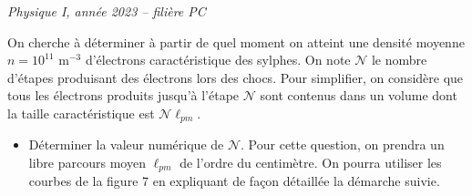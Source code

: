 \textit{Physique I, année 2023 -- filière PC}

On cherche à déterminer à partir de quel moment on atteint une densité moyenne $n = 10^{11}\text{ m}^{-3}$ d'électrons caractéristique des sylphes. On note $\mathscr{N}$ le nombre d'étapes produisant des électrons lors des chocs. Pour simplifier, on considère que tous les électrons produits jusqu'à l'étape $\mathscr{N}$ sont contenus dans un volume dont la taille caractéristique est $\mathscr{N} \ell_{pm}$.

\begin{itemize}
    \item[\textbf{Q -- 24.}] Déterminer la valeur numérique de $\mathscr{N}$. Pour cette question, on prendra un libre parcours moyen $\ell_{pm}$ de l'ordre du centimètre. On pourra utiliser les courbes de la figure 7 en expliquant de façon détaillée la démarche suivie.
\end{itemize}

